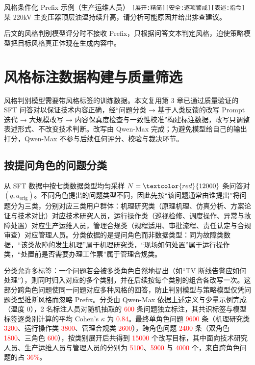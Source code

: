 \documentclass[fontset=fandol,type=master,campus=shenzhen,etitleauto=true]{hithesisbook}
\newcommand{\rev}[1]{\textcolor{red}{#1}}
\begin{document}
\begin{promptbox}{风格条件化 Prefix 示例（生产运维人员）}
\texttt{[展开:精简][安全:逐项警戒][表述:指令]}\quad 某 220kV 主变压器顶层油温持续升高，请分析可能原因并给出排查建议。
\end{promptbox}

后文的风格判别模型评分时不接收 Prefix，只根据问答文本判定风格，迫使策略模型把目标风格真正体现在生成内容中。

\section{风格标注数据构建与质量筛选}\label{ux98ceux683cux504fux597dux6570ux636eux6784ux5efaux4e0e-llm-as-judge-ux7b5bux9009}

风格判别模型需要带风格标签的训练数据。本文复用第 3 章已通过质量验证的 SFT 问答对以保证技术内容正确，经“问题分类 → 基于人类反馈的改写 Prompt 迭代 → 大规模改写 → 内容保真度检查与一致性校准”构建标注数据，改写只调整表述形式、不改变技术判断。改写由 Qwen-Max 完成；为避免模型给自己的输出打分，Qwen-Max 不参与后续任何评分、校验与裁决环节。

\subsection{按提问角色的问题分类}\label{subsec:question-classify}

从 SFT 数据中按七类数据类型均匀采样 $N = \rev{12000}$ 条问答对 $(q, a_{\text{orig}})$。不同角色提出的问题类型不同，因此先按“该问题通常由谁提出”将问题分为三类，分别对应三类用户群体：机理研究类（原理机理、仿真分析、方案论证与技术对比）对应技术研究人员，运行操作类（巡视检修、调度操作、异常与故障处置）对应生产运维人员，管理合规类（规程适用、审批流程、责任认定与合规审查）对应管理人员。分类依据的是提问角色而非数据类型：同为故障类数据，“该类故障的发生机理”属于机理研究类，“现场如何处置”属于运行操作类，“处置前是否需要办理工作票”属于管理合规类。

分类允许多标签：一个问题若会被多类角色自然地提出（如“TV 断线告警应如何处理”），则同时归入对应的多个类别，并在后续按每个类别的组合各改写一次。这部分跨角色问题使同一问题对应多种风格的回答，防止判别模型与策略模型仅凭问题类型推断风格而忽略 Prefix。分类由 Qwen-Max 依据上述定义与少量示例完成（温度 0），2 名标注人员对随机抽取的 \rev{600} 条问题独立标注，其共识标签与模型标签逐类别计算的平均 Cohen's $\kappa$ 为 \rev{0.84}。最终单角色问题 \rev{9600} 条（机理研究类 \rev{3200}、运行操作类 \rev{3800}、管理合规类 \rev{2600}），跨角色问题 \rev{2400} 条（双角色 \rev{1800}、三角色 \rev{600}），按类别展开后共得到 \rev{15000} 个改写目标，其中面向技术研究人员、生产运维人员与管理人员的分别为 \rev{5100}、\rev{5900} 与 \rev{4000} 个，来自跨角色问题的占 \rev{36\%}。
\end{document}
